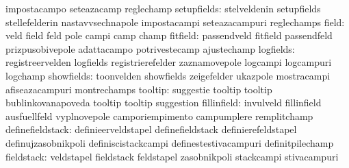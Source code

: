                                   impostacampo                     seteazacamp
                                  reglechamp
                     setupfields: stelveldenin                     setupfields
                                  stellefelderin                   nastavvsechnapole
                                  impostacampi                     seteazacampuri
                                  reglechamps
                           field: veld                             field
                                  feld                             pole
                                  campi                            camp
                                  champ
                        fitfield: passendveld                      fitfield
                                  passendfeld                      prizpusobivepole %
                                  adattacampo                      potrivestecamp
                                  ajustechamp
                       logfields: registreervelden                 logfields
                                  registrierefelder                zaznamovepole
                                  logcampi                         logcampuri
                                  logchamp
                      showfields: toonvelden                       showfields
                                  zeigefelder                      ukazpole
                                  mostracampi                      afiseazacampuri
                                  montrechamps
                         tooltip: suggestie                        tooltip
                                  tooltip                          bublinkovanapoveda
                                  tooltip                          tooltip
                                  suggestion
                     fillinfield: invulveld                        fillinfield
                                  ausfuellfeld                     vyplnovepole
                                  camporiempimento                 campumplere
                                  remplitchamp
                definefieldstack: definieerveldstapel              definefieldstack
                                  definierefeldstapel              definujzasobnikpoli
                                  definiscistackcampi              definestestivacampuri
                                  definitpilechamp
                      fieldstack: veldstapel                       fieldstack
                                  feldstapel                       zasobnikpoli
                                  stackcampi                       stivacampuri
